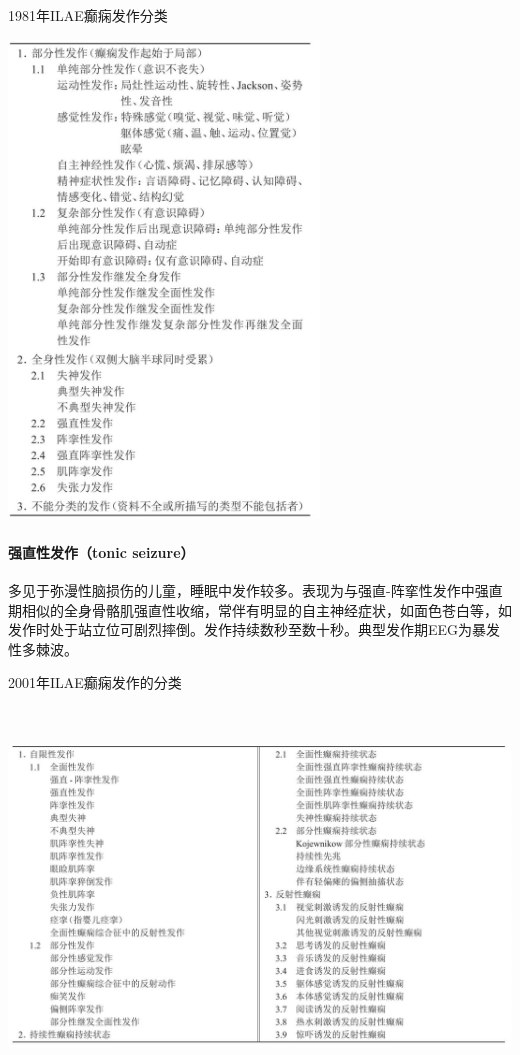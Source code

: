 \begin{table}[htbp]
\centering
\caption{1981年ILAE癫痫发作分类}
\label{tab85-2}
\includegraphics[width=3.25in,height=4.98958in]{./images/Image00385.jpg}
\end{table}

\paragraph{强直性发作（tonic seizure）}

多见于弥漫性脑损伤的儿童，睡眠中发作较多。表现为与强直-阵挛性发作中强直期相似的全身骨骼肌强直性收缩，常伴有明显的自主神经症状，如面色苍白等，如发作时处于站立位可剧烈摔倒。发作持续数秒至数十秒。典型发作期EEG为暴发性多棘波。

\begin{table}[htbp]
\centering
\caption{2001年ILAE癫痫发作的分类}
\label{tab85-3}
\includegraphics[width=6.60417in,height=3.9375in]{./images/Image00386.jpg}
\end{table}

